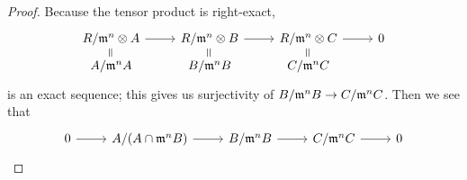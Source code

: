 \begin{proof}
    Because the tensor product is right-exact,
    \begin{equation*}
        \begin{tikzcd}[row sep=tiny]
            R/\mfk{m}^n \otimes A \arrow{r} & R/\mfk{m}^n \otimes B \arrow{r} & R/\mfk{m}^n \otimes C \arrow{r} & 0 \\
            A/\mfk{m}^n A \arrow[phantom]{u}[sloped]{=} & B/\mfk{m}^n B \arrow[phantom]{u}[sloped]{=} & C/\mfk{m}^n C \arrow[phantom]{u}[sloped]{=}
        \end{tikzcd}
    \end{equation*}
    is an exact sequence;
    this gives us surjectivity of \(B/\mathfrak{m}^n B \to C/\mathfrak{m}^n C\).
    Then we see that
    \begin{equation*}
        \begin{tikzcd}
            0 \arrow{r} & A/(A \cap \mfk{m}^n B) \arrow{r} & B/\mfk{m}^n B \arrow{r} & C/\mfk{m}^n C \arrow{r} & 0

\end{tikzcd}
\end{equation*}
\end{proof}
